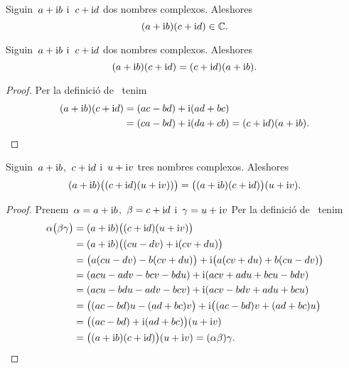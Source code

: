 \documentclass[../Apunts.tex]{subfiles}
\begin{document}
    \begin{observation}
        \label{obs:els nombres complexos estan tancats pel producte}
        Siguin~\(a+\mathrm{i} b\) i~\(c+\mathrm{i} d\) dos nombres complexos.
        Aleshores
        \[(a+\mathrm{i} b)(c+\mathrm{i} d)\in\mathbb{C}.\]
    \end{observation}
    \begin{proposition}
        \label{prop:els nombres complexos commuten pel producte}
        Siguin~\(a+\mathrm{i} b\) i~\(c+\mathrm{i} d\) dos nombres complexos.
        Aleshores
        \[(a+\mathrm{i} b)(c+\mathrm{i} d)=(c+\mathrm{i} d)(a+\mathrm{i} b).\]
    \end{proposition}
    \begin{proof}
        Per la definició de~ tenim
        \begin{align*}
            (a+\mathrm{i} b)(c+\mathrm{i} d)&=(ac-bd)+\mathrm{i}(ad+bc) \\
            &=(ca-bd)+\mathrm{i}(da+cb)=(c+\mathrm{i} d)(a+\mathrm{i} b).\qedhere
        \end{align*}
    \end{proof}
    \begin{proposition}
        \label{prop:els nombres complexos són associatius pel producte}
        Siguin~\(a+\mathrm{i} b\),~\(c+\mathrm{i} d\) i~\(u+\mathrm{i} v\) tres nombres complexos.
        Aleshores
        \[
            (a+\mathrm{i} b)\big((c+\mathrm{i} d)(u+\mathrm{i} v))\big) =
            \big((a+\mathrm{i} b)(c+\mathrm{i} d)\big)(u+\mathrm{i} v).
        \]
    \end{proposition}
    \begin{proof}
        Prenem~\(\alpha=a+\mathrm{i} b\),~\(\beta=c+\mathrm{i} d\) i~\(\gamma=u+\mathrm{i} v\)
        Per la definició de~ tenim
        \begin{align*}
            \alpha\big(\beta\gamma\big)
            &=(a+\mathrm{i} b)\big((c+\mathrm{i} d)(u+\mathrm{i} v)\big) \\
            &=(a+\mathrm{i} b)\big((cu-dv)+\mathrm{i}(cv+du)\big) \\
            &=\big(a(cu-dv)-b(cv+du)\big)+\mathrm{i}\big(a(cv+du)+b(cu-dv)\big) \\
            &=(acu-adv-bcv-bdu)+\mathrm{i}(acv+adu+bcu-bdv) \\
            &=(acu-bdu-adv-bcv)+\mathrm{i}(acv-bdv+adu+bcu) \\
            &=\big((ac-bd)u-(ad+bc)v\big)+\mathrm{i}\big((ac-bd)v+(ad+bc)u\big) \\
            &=\big((ac-bd)+\mathrm{i}(ad+bc)\big)(u+\mathrm{i} v) \\
            &=\big((a+\mathrm{i} b)(c+\mathrm{i} d)\big)(u+\mathrm{i} v)=(\alpha\beta)\gamma.
            \qedhere
        \end{align*}
    \end{proof}
\end{document}

